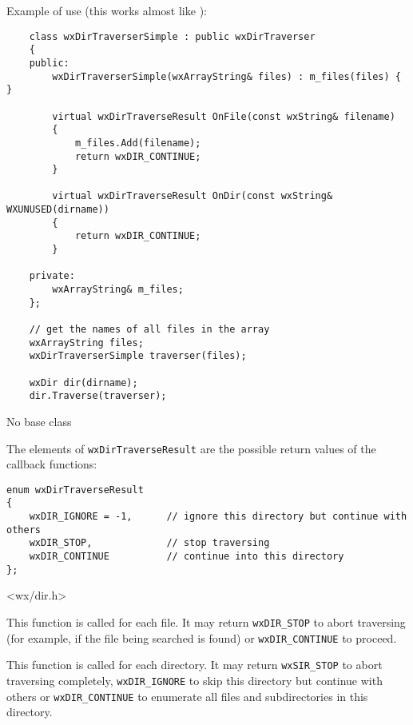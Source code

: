 Example of use (this works almost like ):

\begin{verbatim}
    class wxDirTraverserSimple : public wxDirTraverser
    {
    public:
        wxDirTraverserSimple(wxArrayString& files) : m_files(files) { }

        virtual wxDirTraverseResult OnFile(const wxString& filename)
        {
            m_files.Add(filename);
            return wxDIR_CONTINUE;
        }

        virtual wxDirTraverseResult OnDir(const wxString& WXUNUSED(dirname))
        {
            return wxDIR_CONTINUE;
        }

    private:
        wxArrayString& m_files;
    };

    // get the names of all files in the array
    wxArrayString files;
    wxDirTraverserSimple traverser(files);

    wxDir dir(dirname);
    dir.Traverse(traverser);
\end{verbatim}


No base class


The elements of {\tt wxDirTraverseResult} are the possible return values of the
callback functions:

{\small
\begin{verbatim}
enum wxDirTraverseResult
{
    wxDIR_IGNORE = -1,      // ignore this directory but continue with others
    wxDIR_STOP,             // stop traversing
    wxDIR_CONTINUE          // continue into this directory
};
\end{verbatim}
}


<wx/dir.h>


\label{wxdirtraverseronfile}


This function is called for each file. It may return {\tt wxDIR\_STOP} to abort
traversing (for example, if the file being searched is found) or 
{\tt wxDIR\_CONTINUE} to proceed.

\label{wxdirtraverserondir}


This function is called for each directory. It may return {\tt wxSIR\_STOP} 
to abort traversing completely, {\tt wxDIR\_IGNORE} to skip this directory but
continue with others or {\tt wxDIR\_CONTINUE} to enumerate all files and
subdirectories in this directory.

